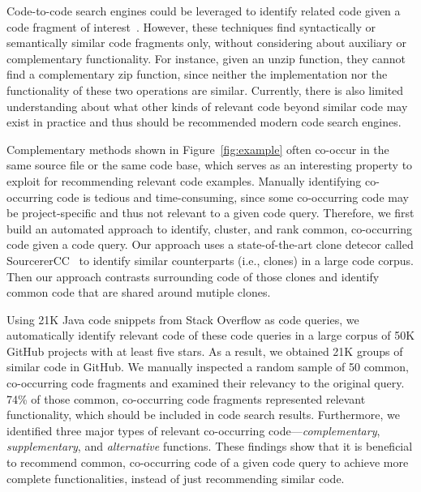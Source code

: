 
 
Code-to-code search engines could be leveraged to identify related code given a code 
fragment of interest~\cite{kim2018Facoy, krugle, searchcode}. 
However, these techniques find syntactically or semantically similar code fragments 
only, without considering about auxiliary or complementary functionality. 
For instance, given an unzip function, they cannot find a complementary zip function, since neither
the implementation nor the functionality of these two operations are similar. 
Currently,  there is also limited understanding about what other kinds of relevant code beyond similar code
may exist in practice and thus should be recommended modern code search engines. 



Complementary methods shown in Figure~\ref{fig:example} often co-occur in the same source file or the same code base, which serves as an interesting property to exploit for recommending relevant code examples.
Manually identifying co-occurring code is tedious and time-consuming, 
since some co-occurring code may be project-specific and thus not relevant to a given code query. 
Therefore, we first build an automated approach to identify, cluster, and rank common, 
co-occurring code given a code query.  
Our approach uses a state-of-the-art clone detecor called SourcererCC~\cite{sajnani2016sourcerercc} to identify similar
counterparts (i.e., clones) in a large code corpus. Then our approach contrasts surrounding code of those clones 
and identify common code that are shared around mutiple clones.

Using 21K Java code snippets from Stack Overflow
as code queries, we automatically identify relevant code of these code queries in a large corpus of  50K GitHub projects with at least five stars. 
As a result, we obtained 21K groups of similar code in GitHub. We manually inspected a random sample of 50 common, co-occurring code fragments and examined their relevancy to the original query. 
74\% of those common, co-occurring code fragments represented relevant functionality, 
which should be included in code search results. 
Furthermore, we identified three major types of relevant co-occurring code---{\em complementary}, {\em supplementary}, and {\em alternative} functions. These findings show that it is beneficial to recommend common, co-occurring code of a given code query to achieve more complete functionalities, instead of just recommending similar code. 

